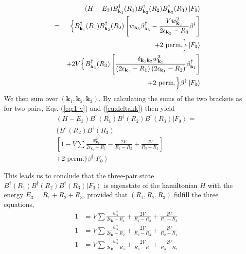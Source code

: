 \documentclass[epj]{svjour}
\begin{document}
\begin{eqnarray}  \label{eq:SchThree3}
&&(H-E _3)B^{\dagger}_{\mathbf{k} _1}(R_1)B^{\dagger}_{\mathbf{k}
_2}(R_2)B^{\dagger}_{\mathbf{k} _3}(R_3)\left|F_0\right>  \nonumber\\
&=& \Bigl\{B^{\dagger}_{\mathbf{k} _1}(R_1)B^{\dagger}_{\mathbf{k}
_2}(R_2)\left[w_{\mathbf{k} _3}\beta^{\dagger}_{\mathbf{k} _3}-\frac{Vw_{%
\mathbf{k} _3}^2}{2\epsilon_{\mathbf{k} _2}-R_3}\beta^{\dagger}\right] \nonumber\\
&&+\text{2 perm.} \Bigr\}\left|F_0\right> \nonumber\\
&&+2V\Bigl\{B^{\dagger}_{\mathbf{k} _3}(R_3)\left[\frac{\delta_{\mathbf{k} _1\mathbf{%
k} _2}w^3_{\mathbf{k} _1}}{\left(2\epsilon_{\mathbf{k} _1}-R_1\right)
\left(2\epsilon_{\mathbf{k} _1}-R_2\right) }\beta^{\dagger}_{\mathbf{k} _1}\right]\nonumber\\
&&\qquad+\text{2 perm.}\Bigr\} 
\beta^{\dagger}\left|F_0\right> 
\end{eqnarray}
We then sum over $\left(\mathbf{k} _1,\mathbf{k} _2,\mathbf{k} _3\right) $. By calculating the sums of the two brackets as for two pairs, Eqs. (\ref{eq:1-v}) and (\ref{eq:deltakk}) then yield
\begin{multline}  \label{eq:SchThree4}
(H-E _3)B^{\dagger}(R_1)B^{\dagger}(R_2)B^{\dagger}(R_3)\left|F_0%
\right>  = \\
\{B^{\dagger}(R_2)B^{\dagger}(R_3) \\
\left[1-V\sum\frac{w_{\mathbf{k} _1}^2}{2\epsilon_{\mathbf{k} _1}-R_1}-\frac{2V%
}{R_1-R_2}+\frac{2V}{R_3-R_1}\right]  \\
+\text{2 perm.}\}\beta^{\dagger}\left|F_0\right>  
\end{multline}

This leads us to  conclude that the three-pair state $%
B^{\dagger}(R_1)B^{\dagger}(R_2)B^{\dagger}(R_3)\left|F_0\right>  $ is
eigenstate of the hamiltonian $H$ with the energy $E _3=R_1+R_2+R_3$,
provided that $\left(R_1,R_2, R_3\right) $ fulfill the three equations, 
\begin{equation}
\begin{split}
1&=V\sum\frac{w_{\mathbf{k} }^2}{2\epsilon_{\mathbf{k} }-R_1}+\frac{2V}{R_1-R_2%
}+\frac{2V}{R_1-R_3} \\
1&=V\sum\frac{w_{\mathbf{k} }^2}{2\epsilon_{\mathbf{k} }-R_2}+\frac{2V}{R_2-R_3%
}+\frac{2V}{R_2-R_1} \\
1&=V\sum\frac{w_{\mathbf{k} }^2}{2\epsilon_{\mathbf{k} }-R_3}+\frac{2V}{R_3-R_1%
}+\frac{2V}{R_3-R_2}
\end{split}%
\end{equation}
\end{document}
